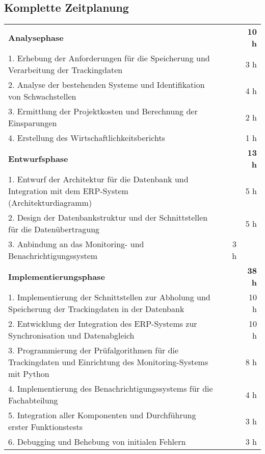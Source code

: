 \subsection{Komplette Zeitplanung}
\label{app:ZeitplanungKomplett}

\begin{tabularx}{\textwidth}{Xrrr}
\label{app:Zeitplanung}\\
\rowcolor{heading}\textbf{Analysephase} & \textbf{} & \textbf{} & \textbf{10 h} \\
1. Erhebung der Anforderungen für die Speicherung und Verarbeitung der Trackingdaten &       &    & 3 h  \\
\rowcolor{odd}2. Analyse der bestehenden Systeme und Identifikation von Schwachstellen &       &    & 4 h  \\
3. Ermittlung der Projektkosten und Berechnung der Einsparungen &       &    & 2 h \\
\rowcolor{odd}4. Erstellung des Wirtschaftlichkeitsberichts &       &    & 1 h  \\
\rowcolor{heading}\textbf{Entwurfsphase} & \textbf{} & \textbf{} & \textbf{13 h} \\
1. Entwurf der Architektur für die Datenbank und Integration mit dem ERP-System (Architekturdiagramm) &       &    & 5 h \\
\rowcolor{odd}2. Design der Datenbankstruktur und der Schnittstellen für die Datenübertragung &       &    & 5 h \\
3. Anbindung an das Monitoring- und Benachrichtigungssystem &       & 3 h   &  \\
\rowcolor{heading}\textbf{Implementierungsphase} & \textbf{} & \textbf{} & \textbf{38 h} \\
1. Implementierung der Schnittstellen zur Abholung und Speicherung der Trackingdaten in der Datenbank &       &    & 10 h  \\
\rowcolor{odd}2. Entwicklung der Integration des ERP-Systems zur Synchronisation und Datenabgleich &       &    & 10 h  \\
3. Programmierung der Prüfalgorithmen für die Trackingdaten und Einrichtung des Monitoring-Systems mit Python &       &    & 8 h  \\
\rowcolor{odd}4. Implementierung des Benachrichtigungssystems für die Fachabteilung &       &    & 4 h \\
5. Integration aller Komponenten und Durchführung erster Funktionstests &       &    & 3 h \\
\rowcolor{odd}6. Debugging und Behebung von initialen Fehlern &       &    & 3 h \\

\end{tabularx}
